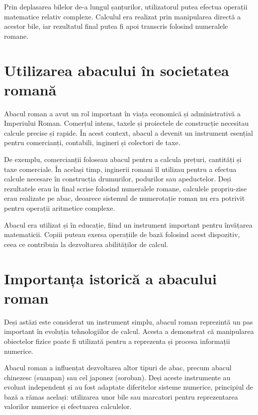 \documentclass[12pt,a4paper]{article}
\begin{document}
Prin deplasarea bilelor de-a lungul șanțurilor, utilizatorul putea efectua operații matematice relativ complexe. Calculul era realizat prin manipularea directă a acestor bile, iar rezultatul final putea fi apoi transcris folosind numeralele romane. \cite{romanhandabacus}

\section*{Utilizarea abacului în societatea romană}

Abacul roman a avut un rol important în viața economică și administrativă a Imperiului Roman. Comerțul intens, taxele și proiectele de construcție necesitau calcule precise și rapide. În acest context, abacul a devenit un instrument esențial pentru comercianți, contabili, ingineri și colectori de taxe. \cite{unrvabacus}

De exemplu, comercianții foloseau abacul pentru a calcula prețuri, cantități și taxe comerciale. În același timp, inginerii romani îl utilizau pentru a efectua calcule necesare în construcția drumurilor, podurilor sau apeductelor. Deși rezultatele erau în final scrise folosind numeralele romane, calculele propriu-zise erau realizate pe abac, deoarece sistemul de numerotație roman nu era potrivit pentru operații aritmetice complexe. \cite{romanhandabacus}

Abacul era utilizat și în educație, fiind un instrument important pentru învățarea matematicii. Copiii puteau exersa operațiile de bază folosind acest dispozitiv, ceea ce contribuia la dezvoltarea abilităților de calcul. \cite{unrvabacus}

\section*{Importanța istorică a abacului roman}

Deși astăzi este considerat un instrument simplu, abacul roman reprezintă un pas important în evoluția tehnologiilor de calcul. Acesta a demonstrat că manipularea obiectelor fizice poate fi utilizată pentru a reprezenta și procesa informații numerice.

Abacul roman a influențat dezvoltarea altor tipuri de abac, precum abacul chinezesc (suanpan) sau cel japonez (soroban). Deși aceste instrumente au evoluat independent și au fost adaptate diferitelor sisteme numerice, principiul de bază a rămas același: utilizarea unor bile sau marcatori pentru reprezentarea valorilor numerice și efectuarea calculelor. \cite{ancientcomputers}
\end{document}
